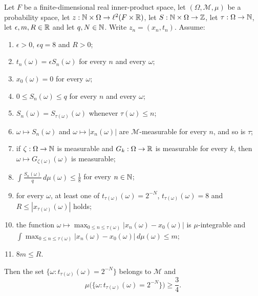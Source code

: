 \begin{lemma}
Let $F$ be a finite-dimensional real inner-product space, let
$(\Omega,\mathcal M,\mu)$ be a probability space, let
$z:\mathbb{N}\times\Omega\to\ell^2(F\times\mathbb{R})$, let $S:\mathbb{N}\times\Omega\to\mathbb{Z}$, let
$\tau:\Omega\to\mathbb{N}$, let $\epsilon,m,R\in\mathbb{R}$ and let $q,N\in\mathbb{N}$. Write
$z_n=(x_n,t_n)$. Assume:
\begin{enumerate}
\item\label{it:swle-eps} $\epsilon>0$, $\epsilon q=8$ and $R>0$;
\item\label{it:swle-lat} $t_n(\omega)=\epsilon S_n(\omega)$ for every $n$ and
every $\omega$;
\item\label{it:swle-x0} $x_0(\omega)=0$ for every $\omega$;
\item\label{it:swle-range} $0\le S_n(\omega)\le q$ for every $n$ and every
$\omega$;
\item\label{it:swle-froz} $S_n(\omega)=S_{\tau(\omega)}(\omega)$ whenever
$\tau(\omega)\le n$;
\item\label{it:swle-meas} $\omega\mapsto S_n(\omega)$ and
$\omega\mapsto|x_n(\omega)|$ are $\mathcal M$-measurable for every $n$, and so
is $\tau$;
\item\label{it:swle-idx} if $\zeta:\Omega\to\mathbb{N}$ is measurable and
$G_k:\Omega\to\mathbb{R}$ is measurable for every $k$, then
$\omega\mapsto G_{\zeta(\omega)}(\omega)$ is measurable;
\item\label{it:swle-upper} $\displaystyle\int\frac{S_n(\omega)}{q}\,d\mu(\omega)
\le\frac18$ for every $n\in\mathbb{N}$;
\item\label{it:swle-exit} for every $\omega$, at least one of
$t_{\tau(\omega)}(\omega)=2^{-N}$, $t_{\tau(\omega)}(\omega)=8$ and
$R\le|x_{\tau(\omega)}(\omega)|$ holds;
\item\label{it:swle-travel} the function
$\omega\mapsto\max_{0\le n\le\tau(\omega)}|x_n(\omega)-x_0(\omega)|$ is
$\mu$-integrable and
$\displaystyle\int\max_{0\le n\le\tau(\omega)}|x_n(\omega)-x_0(\omega)|
\,d\mu(\omega)\le m$;
\item\label{it:swle-cut} $8m\le R$.
\end{enumerate}
Then the set $\{\omega:t_{\tau(\omega)}(\omega)=2^{-N}\}$ belongs to
$\mathcal M$ and
\begin{equation}\label{eq:swle-bound}
  \mu\bigl(\{\omega:t_{\tau(\omega)}(\omega)=2^{-N}\}\bigr)\ge\frac34 .
\end{equation}
\end{lemma}
